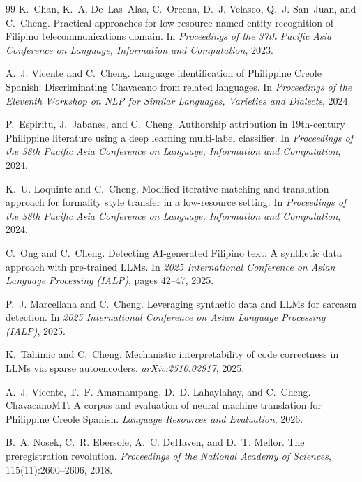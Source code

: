 \documentclass[11pt,a4paper]{article}
\begin{document}
\begin{thebibliography}{99}
K.~Chan, K.~A. De~Las~Alas, C.~Orcena, D.~J. Velasco, Q.~J. San~Juan, and C.~Cheng.
\newblock Practical approaches for low-resource named entity recognition of Filipino telecommunications domain.
\newblock In \emph{Proceedings of the 37th Pacific Asia Conference on Language, Information and Computation}, 2023.

A.~J. Vicente and C.~Cheng.
\newblock Language identification of Philippine Creole Spanish: Discriminating Chavacano from related languages.
\newblock In \emph{Proceedings of the Eleventh Workshop on NLP for Similar Languages, Varieties and Dialects}, 2024.

P.~Espiritu, J.~Jabanes, and C.~Cheng.
\newblock Authorship attribution in 19th-century Philippine literature using a deep learning multi-label classifier.
\newblock In \emph{Proceedings of the 38th Pacific Asia Conference on Language, Information and Computation}, 2024.

K.~U. Loquinte and C.~Cheng.
\newblock Modified iterative matching and translation approach for formality style transfer in a low-resource setting.
\newblock In \emph{Proceedings of the 38th Pacific Asia Conference on Language, Information and Computation}, 2024.

C.~Ong and C.~Cheng.
\newblock Detecting AI-generated Filipino text: A synthetic data approach with pre-trained LLMs.
\newblock In \emph{2025 International Conference on Asian Language Processing (IALP)}, pages 42--47, 2025.

P.~J. Marcellana and C.~Cheng.
\newblock Leveraging synthetic data and LLMs for sarcasm detection.
\newblock In \emph{2025 International Conference on Asian Language Processing (IALP)}, 2025.

K.~Tahimic and C.~Cheng.
\newblock Mechanistic interpretability of code correctness in LLMs via sparse autoencoders.
\newblock \emph{arXiv:2510.02917}, 2025.

A.~J. Vicente, T.~F. Amamampang, D.~D. Lahaylahay, and C.~Cheng.
\newblock ChavacanoMT: A corpus and evaluation of neural machine translation for Philippine Creole Spanish.
\newblock \emph{Language Resources and Evaluation}, 2026.

B.~A. Nosek, C.~R. Ebersole, A.~C. DeHaven, and D.~T. Mellor.
\newblock The preregistration revolution.
\newblock \emph{Proceedings of the National Academy of Sciences}, 115(11):2600--2606, 2018.


\end{thebibliography}
\end{document}
